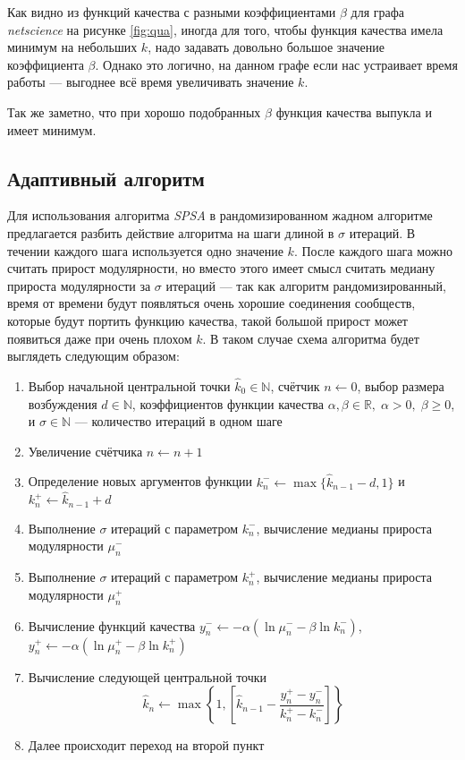 Как видно из функций качества с разными коэффициентами $\beta$ для графа \emph{netscience} на рисунке \ref{fig:qua}, иногда для того, чтобы функция качества имела минимум на небольших $k$, надо задавать довольно большое значение коэффициента $\beta$. Однако это логично, на данном графе если нас устраивает время работы --- выгоднее всё время увеличивать значение $k$.

Так же заметно, что при хорошо подобранных $\beta$ функция качества выпукла и имеет минимум.



\subsection{Адаптивный алгоритм}

Для использования алгоритма \emph{SPSA} в рандомизированном жадном алгоритме предлагается разбить действие алгоритма на шаги длиной в $\sigma$ итераций. В течении каждого шага используется одно значение $k$. После каждого шага можно считать прирост модулярности, но вместо этого имеет смысл считать медиану прироста модулярности за $\sigma$ итераций --- так как алгоритм рандомизированный, время от времени будут появляться очень хорошие соединения сообществ, которые будут портить функцию качества, такой большой прирост может появиться даже при очень плохом $k$. В таком случае схема алгоритма будет выглядеть следующим образом:

\begin{enumerate}
	\item Выбор начальной центральной точки $\hat{k}_0 \in \mathbb{N}$, счётчик $n \leftarrow 0$, выбор размера возбуждения $d \in \mathbb{N}$, коэффициентов функции качества $\alpha, \beta \in \mathbb{R},\; \alpha > 0,\;\beta \ge 0$, и $\sigma \in \mathbb{N}$ --- количество итераций в одном шаге
	\item Увеличение счётчика $n \leftarrow n + 1$
	\item Определение новых аргументов функции $k_{n}^{-} \leftarrow \max\{\hat{k}_{n - 1} - d, 1\}$ и $k_{n}^{+} \leftarrow \hat{k}_{n - 1} + d$
	\item Выполнение $\sigma$ итераций с параметром $k_{n}^{-}$, вычисление медианы прироста модулярности $\mu_n^{-}$
	\item Выполнение $\sigma$ итераций с параметром $k_{n}^{+}$, вычисление медианы прироста модулярности $\mu_n^{+}$
	\item Вычисление функций качества $y_n^{-} \leftarrow -\alpha (\ln \mu_n^{-} - \beta \ln k_n^{-})$, $y_n^{+} \leftarrow -\alpha (\ln \mu_n^{+} - \beta \ln k_n^{+})$
	\item Вычисление следующей центральной точки
	\begin{equation} \label{eq:arg-centre}
		\hat{k}_n \leftarrow \max\left\{1, \left[\hat{k}_{n - 1} - \frac{y_n^{+} - y_n^{-}}{k_n^{+} - k_n^{-}}\right]\right\}
	\end{equation}
	\item Далее происходит переход на второй пункт
\end{enumerate}


